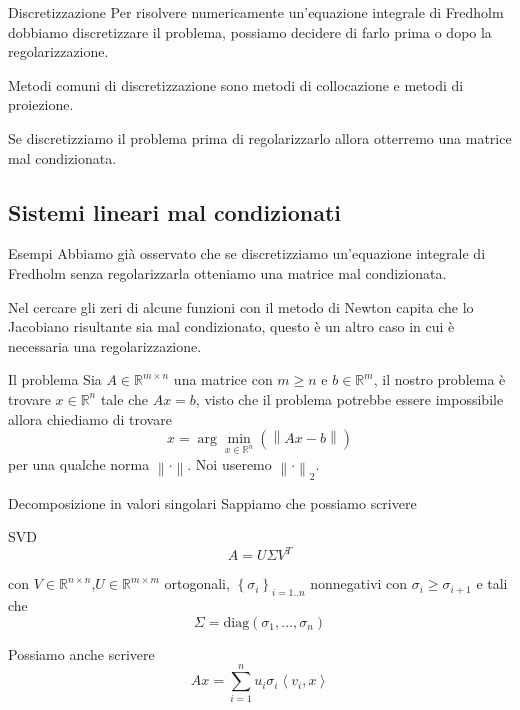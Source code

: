 \documentclass{beamer}
\theoremstyle{plain}
\theoremstyle{definition}
\theoremstyle{remark}
\newcommand{\set}[1]{\left\{#1\right\}}
\newcommand{\pa}[1]{\left(#1\right)}
\newcommand{\ang}[1]{\left<#1\right>}
\newcommand{\norm}[1]{\left\|#1\right\|}
\begin{document}
\begin{frame}{Discretizzazione}
  Per risolvere numericamente un'equazione integrale di Fredholm
  dobbiamo discretizzare il problema, possiamo decidere di farlo
  prima o dopo la regolarizzazione.
  \vfill
  
  Metodi comuni di discretizzazione sono metodi di collocazione e
  metodi di proiezione.
  \vfill
  
  Se discretizziamo il problema prima di regolarizzarlo allora
  otterremo una matrice mal condizionata.
\end{frame}



\subsection{Sistemi lineari mal condizionati}

\begin{frame}{Esempi}
  Abbiamo già osservato che se discretizziamo un'equazione integrale di
  Fredholm senza regolarizzarla otteniamo una matrice mal
  condizionata.
  \vfill
  
  Nel cercare gli zeri di alcune funzioni con il metodo di Newton
  capita che lo Jacobiano risultante sia mal condizionato, questo è un
  altro caso in cui è necessaria una regolarizzazione.
\end{frame}

\begin{frame}{Il problema}
  Sia $A\in \mathbb{R}^{m \times n}$ una matrice con $m \ge n$ e $b
  \in \mathbb{R}^m$, il nostro problema è trovare $x \in \mathbb{R}^n$
  tale che $Ax = b$, visto che il problema potrebbe essere impossibile
  allora chiediamo di trovare
  \[ x = \arg\min _{x\in \mathbb{R}^n} \pa{ \norm{Ax -b} } \]
  per una qualche norma $\norm{\cdot}$. Noi useremo $\norm{\cdot}_2$.
\end{frame}

\begin{frame}{Decomposizione in valori singolari}
  Sappiamo che possiamo scrivere
  \begin{block}{SVD}
    \[ A = U\Sigma V^T \] 
  \end{block}
  con $V\in \mathbb{R}^{n\times n}$,$U\in \mathbb{R}^{m\times m}$
  ortogonali, $\set{\sigma _i}_{i=1..n}$ nonnegativi con $\sigma _i
  \ge \sigma _{i+1}$ e tali che
  \[ \Sigma = \mathrm{diag} \pa{ \sigma_1,...,\sigma _n} \]
  
  Possiamo anche scrivere
  \[ Ax = \sum _{i=1} ^n u_i \sigma _i \ang{v_i,x} \]
\end{frame}
\end{document}

